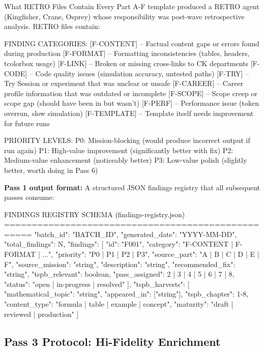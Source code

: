\documentclass[11pt,letterpaper]{article}
\begin{document}
\begin{retrobox}{What RETRO Files Contain}
Every Part A-F template produced a RETRO agent (Kingfisher, Crane, Osprey) whose
responsibility was post-wave retrospective analysis. RETRO files contain:

FINDING CATEGORIES:
  [F-CONTENT]  -- Factual content gaps or errors found during production
  [F-FORMAT]   -- Formatting inconsistencies (tables, headers, tcolorbox usage)
  [F-LINK]     -- Broken or missing cross-links to CK departments
  [F-CODE]     -- Code quality issues (simulation accuracy, untested paths)
  [F-TRY]      -- Try Session or experiment that was unclear or unsafe
  [F-CAREER]   -- Career profile information that was outdated or incomplete
  [F-SCOPE]    -- Scope creep or scope gap (should have been in but wasn't)
  [F-PERF]     -- Performance issue (token overrun, slow simulation)
  [F-TEMPLATE] -- Template itself needs improvement for future runs

PRIORITY LEVELS:
  P0: Mission-blocking (would produce incorrect output if run again)
  P1: High-value improvement (significantly better with fix)
  P2: Medium-value enhancement (noticeably better)
  P3: Low-value polish (slightly better, worth doing in Pass 6)
\end{retrobox}

\textbf{Pass 1 output format:} A structured JSON findings registry that all subsequent passes consume:

\begin{asciibox}
FINDINGS REGISTRY SCHEMA (findings-registry.json)
===================================================
{
  "batch\_id": "{BATCH\_ID}",
  "generated\_date": "YYYY-MM-DD",
  "total\_findings": N,
  "findings": [
    {
      "id": "F001",
      "category": "F-CONTENT | F-FORMAT | ...",
      "priority": "P0 | P1 | P2 | P3",
      "source\_part": "A | B | C | D | E | F",
      "source\_mission": "string",
      "description": "string",
      "recommended\_fix": "string",
      "tspb\_relevant": boolean,
      "pass\_assigned": 2 | 3 | 4 | 5 | 6 | 7 | 8,
      "status": "open | in-progress | resolved"
    }
  ],
  "tspb\_harvests": [
    {
      "mathematical\_topic": "string",
      "appeared\_in": ["string"],
      "tspb\_chapter": 1-8,
      "content\_type": "formula | table | example | concept",
      "maturity": "draft | reviewed | production"
    }
  ]
}
\end{asciibox}

\subsection{Pass 3 Protocol: Hi-Fidelity Enrichment}
\end{document}
